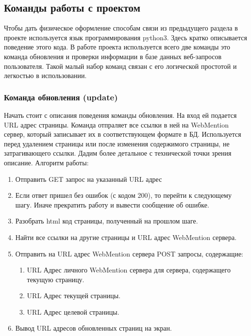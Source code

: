 \hypertarget{ux43aux43eux43cux430ux43dux434ux44b-ux440ux430ux431ux43eux442ux44b-ux441-ux43fux440ux43eux435ux43aux442ux43eux43c}{%
\subsection{Команды работы с
проектом}\label{ux43aux43eux43cux430ux43dux434ux44b-ux440ux430ux431ux43eux442ux44b-ux441-ux43fux440ux43eux435ux43aux442ux43eux43c}}

Чтобы дать физическое оформление способам связи из предыдущего раздела в
проекте используется язык программирования python3. Здесь кратко
описывается поведение этого кода. В работе проекта используется всего
две команды это команда обновления и проверки информации в базе данных
веб-запросов пользователя. Такой малый набор команд связан с его
логической простотой и легкостью в использовании.

\hypertarget{ux43aux43eux43cux430ux43dux434ux430-ux43eux431ux43dux43eux432ux43bux435ux43dux438ux44f-update}{%
\subsubsection{Команда обновления
(update)}\label{ux43aux43eux43cux430ux43dux434ux430-ux43eux431ux43dux43eux432ux43bux435ux43dux438ux44f-update}}

Начать стоит с описания поведения команды обновления. На вход ей
подается URL адрес страницы. Команда отпраляет все ссылки в ней на
WebMention сервер, который записывает их в соответствующем формате в БД.
Используется перед удалением страницы или после изменения содержимого
страницы, не затрагивающего ссылки. Дадим более детальное с технической
точки зрения описание. Алгоритм работы:

\begin{enumerate}
\def\labelenumi{\arabic{enumi}.}
\tightlist
\item
  Отправить GET запрос на указанный URL адрес
\item
  Если ответ пришел без ошибок (с кодом 200), то перейти к следующему
  шагу. Иначе прекратить работу и вывести сообщение об ошибке.
\item
  Разобрать html код страницы, полученный на прошлом шаге.
\item
  Найти все ссылки на другие страницы и URL адрес WebMention сервера.
\item
  Отправить на URL адрес WebMention сервера POST запросы, содержащие:

  \begin{enumerate}
  \def\labelenumii{\arabic{enumii}.}
  \tightlist
  \item
    URL Адрес личного WebMention сервера для сервера, содержащего
    текущую страницу.
  \item
    URL Адрес текущей страницы.
  \item
    URL Адрес целевой страницы.
  \end{enumerate}
\item
  Вывод URL адресов обновленных страниц на экран.
\end{enumerate}

